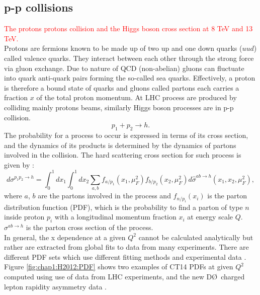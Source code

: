 \subsection{p-p collisions}
\label{chap1:H2012:PP}
\textcolor{red}{The protons protons collision and the Higgs boson cross section at 8 TeV and 13 TeV. \\}
Protons are fermions known to be made up of two up and one down quarks ($uud$) called valence quarks. They interact between each other through the strong force via gluon exchange. Due to nature of QCD (non-abelian) gluons can fluctuate into quark anti-quark pairs forming the so-called sea quarks. Effectively, a proton is therefore a bound state of quarks and gluons called partons each carries a fraction $x$ of the total proton momentum. At LHC process are produced by colliding mainly protons beams, similarly Higgs boson processes are in p-p collision.
\begin{equation}
    p_1 + p_2 \rightarrow h.
\end{equation}
The probability for a process to occur is expressed in terms of its cross section, and the dynamics of its products is determined by the dynamics of partons involved in the collision. The hard scattering cross section for such process is given by :
\begin{equation}
    d \sigma^{p_{1} p_{2} \rightarrow h}=\int_{0}^{1} d x_{1} \int_{0}^{1} d x_{2} \sum_{a, b} f_{a / p_{1}}\left(x_{1}, \mu_{F}^{2}\right) f_{b / p_{2}}\left(x_{2}, \mu_{F}^{2}\right) d \hat{\sigma}^{a b \rightarrow h}\left(x_1, x_2, \mu_{F}^{2}\right), 
\end{equation}
where $a$, $b$ are the partons involved in the process and $f_{n/p_i}(x_i)$ is the parton distribution function (PDF), which is the probability to find a parton of type $n$ inside proton $p_i$ with a longitudinal momentum fraction $x_i$ at energy scale $Q$. $\sigma^{a b \rightarrow h}$ is the parton cross section of the process. \\
In general, the x dependence at a given $Q^2$ cannot be calculated analytically but rather are extracted from global fits to data from many experiments. There are different PDF sets which use different fitting methods and experimental data \cite{PDF}. Figure \ref{fig:chap1:H2012:PDF} shows two examples of CT14 PDFs at given $Q^2$ computed using use of data from LHC experiments, and the new D\O \ charged lepton rapidity asymmetry data \cite{CT14}. 
